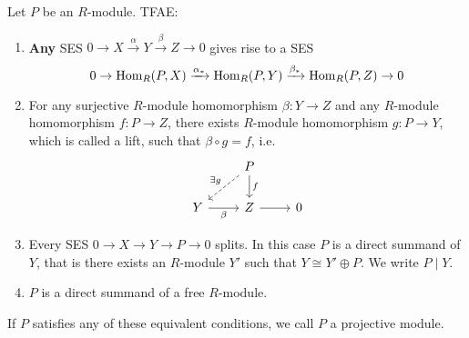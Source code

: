 \begin{pro}  \label{pro: Proj Mod}
    Let $P$ be an $R$-module. TFAE:
    \begin{enumerate}
        \item \textbf{Any} SES $0 \to X\xrightarrow{\alpha} Y\xrightarrow{\beta} Z\to 0$ gives rise to a SES 
        \[0 \to \operatorname{Hom}_R(P,X)\xrightarrow{\alpha_*}\operatorname{Hom}_R(P,Y)\xrightarrow{\beta_*}\operatorname{Hom}_R(P,Z)\to 0\]
        \item For any surjective $R$-module homomorphism $\beta:Y\to Z$ and any $R$-module homomorphism $f:P\to Z$, there exists $R$-module homomorphism $g: P\to Y$, which is called a lift, such that $\beta \circ g = f$, i.e.
        \[\begin{tikzcd}[sep=small]
	&& P \\
	\\
	Y && Z && 0
	\arrow["{\exists g}"', dashed, from=1-3, to=3-1]
	\arrow["f", from=1-3, to=3-3]
	\arrow["\beta"', from=3-1, to=3-3]
	\arrow[from=3-3, to=3-5]
\end{tikzcd}\]
        \item Every SES $0\to X\to Y\to P\to 0$ splits. In this case $P$ is a direct summand of $Y$, that is there exists an $R$-module $Y'$ such that $Y\cong Y'\oplus P$. We write $P\mid Y$.
        \item $P$ is a direct summand of a free $R$-module.
    \end{enumerate}
    If $P$ satisfies any of these equivalent conditions, we call $P$ a projective module.
\end{pro}

